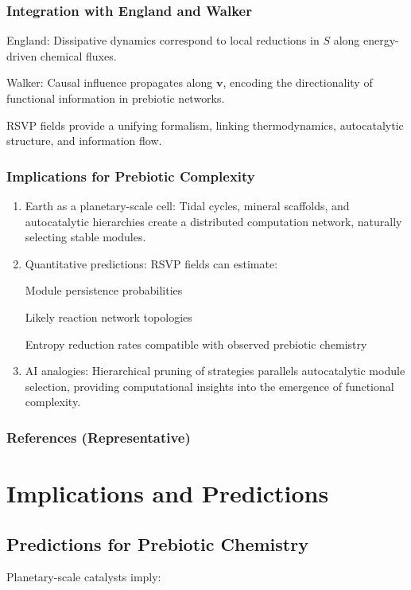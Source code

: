 \documentclass{book}
\begin{document}
\section{Integration with England and Walker}
England: Dissipative dynamics correspond to local reductions in $S$ along energy-driven chemical fluxes.

Walker: Causal influence propagates along $\mathbf{v}$, encoding the directionality of functional information in prebiotic networks.

RSVP fields provide a unifying formalism, linking thermodynamics, autocatalytic structure, and information flow.

\section{Implications for Prebiotic Complexity}
\begin{enumerate}
\item Earth as a planetary-scale cell: Tidal cycles, mineral scaffolds, and autocatalytic hierarchies create a distributed computation network, naturally selecting stable modules.
\item Quantitative predictions: RSVP fields can estimate:

Module persistence probabilities

Likely reaction network topologies

Entropy reduction rates compatible with observed prebiotic chemistry
\item AI analogies: Hierarchical pruning of strategies parallels autocatalytic module selection, providing computational insights into the emergence of functional complexity.
\end{enumerate}

\section{References (Representative)}
\citep{hazen2005}

\citep{england2013}

\citep{walker2013}

\citep{endres2025}

\part{Implications and Predictions}

\chapter{Predictions for Prebiotic Chemistry}
Planetary-scale catalysts imply:
\end{document}
